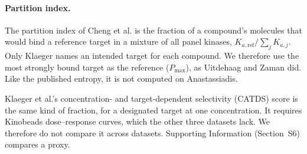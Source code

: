 \paragraph{Partition index.} The partition index of Cheng et al.\cite{Cheng2010} is the fraction of a
compound's molecules that would bind a reference target in a mixture of all panel kinases,
$K_{a,\mathrm{ref}} / \sum_j K_{a,j}$. Only Klaeger names an intended target
for each compound. We therefore use the most strongly bound target as the
reference ($P_{\max}$), as Uitdehaag and Zaman\cite{Uitdehaag2011} did. Like
the published entropy, it is not computed on Anastassiadis.

Klaeger et al.'s concentration- and target-dependent selectivity (CATDS) score
is the same kind of fraction, for a designated target at one concentration.
It requires Kinobeads dose--response curves, which the other three datasets
lack. We therefore do not compare it across datasets. Supporting Information
(Section~S6) compares a proxy.

